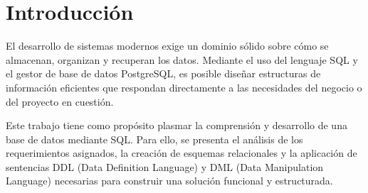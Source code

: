 \section{Introducción}

 El desarrollo de sistemas modernos exige un dominio sólido sobre cómo se almacenan, organizan y recuperan los datos. Mediante el uso del lenguaje SQL y el gestor de base de datos PostgreSQL, es posible diseñar estructuras de información eficientes que respondan directamente a las necesidades del negocio o del proyecto en cuestión.

Este trabajo tiene como propósito plasmar la comprensión y desarrollo de una base de datos mediante SQL. Para ello, se presenta el análisis de los requerimientos asignados, la creación de esquemas relacionales y la aplicación de sentencias DDL (Data Definition Language) y DML (Data Manipulation Language) necesarias para construir una solución funcional y estructurada.
